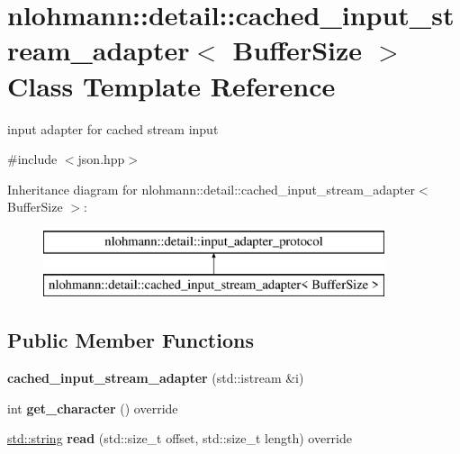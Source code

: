 \hypertarget{classnlohmann_1_1detail_1_1cached__input__stream__adapter}{}\section{nlohmann\+:\+:detail\+:\+:cached\+\_\+input\+\_\+stream\+\_\+adapter$<$ Buffer\+Size $>$ Class Template Reference}
\label{classnlohmann_1_1detail_1_1cached__input__stream__adapter}


input adapter for cached stream input  




{\ttfamily \#include $<$json.\+hpp$>$}

Inheritance diagram for nlohmann\+:\+:detail\+:\+:cached\+\_\+input\+\_\+stream\+\_\+adapter$<$ Buffer\+Size $>$\+:\begin{figure}[H]
\begin{center}
\leavevmode
\includegraphics[height=2.000000cm]{db/dad/classnlohmann_1_1detail_1_1cached__input__stream__adapter}
\end{center}
\end{figure}
\subsection*{Public Member Functions}
\begin{DoxyCompactItemize}
\item 
\mbox{\label{classnlohmann_1_1detail_1_1cached__input__stream__adapter_a4827c5bf63460dc04ce04d97d52d73b1}} 
{\bfseries cached\+\_\+input\+\_\+stream\+\_\+adapter} (std\+::istream \&i)
\item 
\mbox{\label{classnlohmann_1_1detail_1_1cached__input__stream__adapter_a4a6fc864751cf727b134f1c2bf31b523}} 
int {\bfseries get\+\_\+character} () override
\item 
\mbox{\label{classnlohmann_1_1detail_1_1cached__input__stream__adapter_ab9531a66a29685ec87646e99b516c263}} 
\mbox{\hyperlink{namespacenlohmann_1_1detail_a90aa5ef615aa8305e9ea20d8a947980fab45cffe084dd3d20d928bee85e7b0f21}{std\+::string}} {\bfseries read} (std\+::size\+\_\+t offset, std\+::size\+\_\+t length) override
\end{DoxyCompactItemize}


